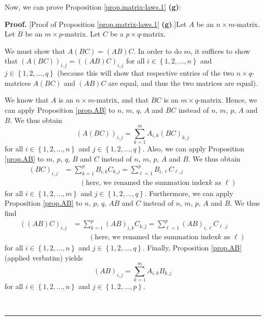 \documentclass[numbers=enddot,12pt,final,onecolumn,notitlepage]{scrartcl}%
\theoremstyle{definition}
\newenvironment{proof}[1][Proof]{\noindent\textbf{#1.} }{\ \rule{0.5em}{0.5em}}
\let\sumnonlimits\sum
\renewcommand{\sum}{\sumnonlimits\limits}
\begin{document}
Now, we can prove Proposition \ref{prop.matrix-laws.1} \textbf{(g)}:

\begin{proof}
[Proof of Proposition \ref{prop.matrix-laws.1} \textbf{(g)}.]Let $A$ be an
$n\times m$-matrix. Let $B$ be an $m\times p$-matrix. Let $C$ be a $p\times q$-matrix.

We must show that $A\left(  BC\right)  =\left(  AB\right)  C$. In order to do
so, it suffices to show that $\left(  A\left(  BC\right)  \right)
_{i,j}=\left(  \left(  AB\right)  C\right)  _{i,j}$ for all $i\in\left\{
1,2,\ldots,n\right\}  $ and $j\in\left\{  1,2,\ldots,q\right\}  $ (because
this will show that respective entries of the two $n\times q$-matrices
$A\left(  BC\right)  $ and $\left(  AB\right)  C$ are equal, and thus the two
matrices are equal).

We know that $A$ is an $n\times m$-matrix, and that $BC$ is an $m\times
q$-matrix. Hence, we can apply Proposition \ref{prop.AB} to $n$, $m$, $q$, $A$
and $BC$ instead of $n$, $m$, $p$, $A$ and $B$. We thus obtain%
\begin{equation}
\left(  A\left(  BC\right)  \right)  _{i,j}=\sum_{k=1}^{m}A_{i,k}\left(
BC\right)  _{k,j} \label{pf.prop.matrix-laws.1.g.A(BC)}%
\end{equation}
for all $i\in\left\{  1,2,\ldots,n\right\}  $ and $j\in\left\{  1,2,\ldots
,q\right\}  $. Also, we can apply Proposition \ref{prop.AB} to $m$, $p$, $q$,
$B$ and $C$ instead of $n$, $m$, $p$, $A$ and $B$. We thus obtain%
\begin{align}
\left(  BC\right)  _{i,j}  &  =\sum_{k=1}^{p}B_{i,k}C_{k,j}=\sum_{\ell=1}%
^{p}B_{i,\ell}C_{\ell,j}\label{pf.prop.matrix-laws.1.g.BC}\\
&  \ \ \ \ \ \ \ \ \ \ \left(  \text{here, we renamed the summation index
}k\text{ as }\ell\right) \nonumber
\end{align}
for all $i\in\left\{  1,2,\ldots,m\right\}  $ and $j\in\left\{  1,2,\ldots
,q\right\}  $. Furthermore, we can apply Proposition \ref{prop.AB} to $n$,
$p$, $q$, $AB$ and $C$ instead of $n$, $m$, $p$, $A$ and $B$. We thus find%
\begin{align}
\left(  \left(  AB\right)  C\right)  _{i,j}  &  =\sum_{k=1}^{p}\left(
AB\right)  _{i,k}C_{k,j}=\sum_{\ell=1}^{p}\left(  AB\right)  _{i,\ell}%
C_{\ell,j}\label{pf.prop.matrix-laws.1.g.(AB)C}\\
&  \ \ \ \ \ \ \ \ \ \ \left(  \text{here, we renamed the summation index
}k\text{ as }\ell\right) \nonumber
\end{align}
for all $i\in\left\{  1,2,\ldots,n\right\}  $ and $j\in\left\{  1,2,\ldots
,q\right\}  $. Finally, Proposition \ref{prop.AB} (applied verbatim) yields%
\begin{equation}
\left(  AB\right)  _{i,j}=\sum_{k=1}^{m}A_{i,k}B_{k,j}
\label{pf.prop.matrix-laws.1.g.AB}%
\end{equation}
for all $i\in\left\{  1,2,\ldots,n\right\}  $ and $j\in\left\{  1,2,\ldots
,p\right\}  $.


\end{proof}
\end{document}
